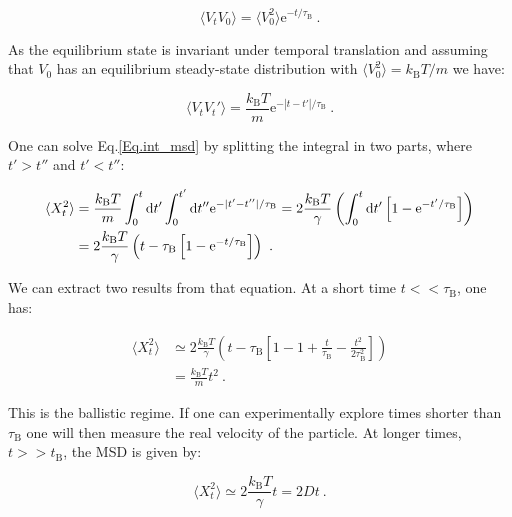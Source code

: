\begin{equation}
	\langle V_t V_0 \rangle = \langle V_0 ^2 \rangle \mathrm{e}^{-t/\tau_{\mathrm{B}}}~.
\end{equation}

As the equilibrium state is invariant under temporal translation and assuming that $V_0$ has an equilibrium steady-state distribution with $\langle V_0^2 \rangle = k_\mathrm{B} T / m$ we have:

\begin{equation}
	\langle V_t V_t' \rangle = \frac{k_\mathrm{B}T}{m} \mathrm{e}^{-|t-t'|/\tau_{\mathrm{B}}}~.
\end{equation}

One can solve Eq.\ref{Eq.int_msd} by splitting the integral in two parts, where $t'>t''$ and $ t' < t''$:

\begin{equation}
	\begin{aligned}
		\langle X_t ^2 \rangle & =    \frac{k_\mathrm{B}T}{m}  \int _0 ^t \textnormal{d}t' \int _0 ^{t'} \textnormal{d}t'' \mathrm{e} ^ {- |t' - t''| / \tau_\mathrm{B}} = 2 \frac{k_\mathrm{B}T}{\gamma} \left( \int_0 ^t \textnormal{d}t' \left[1 - \mathrm{e}^{-t'/\tau_\mathrm{B}} \right] \right) \\
		& = 2 \frac{k_\mathrm{B} T}{\gamma} \left( t - \tau_\mathrm{B} \left[ 1 - \mathrm{e}^{-t/\tau_\mathrm{B}} \right] \right) ~.
	\end{aligned}
\end{equation}

We can extract two results from that equation. At a short time $t << \tau_\mathrm{B}$, one has:

\begin{equation}
	\begin{aligned}
		\langle X_t ^2 \rangle & \simeq  2 \frac{k_\mathrm{B} T}{\gamma} \left( t - \tau_\mathrm{B} \left[ 1 - 1 + \frac{t}{\tau_\mathrm{B}} - \frac{t^2}{ 2 \tau_\mathrm{B} ^2}\right]         \right) \\
		& = \frac{k_\mathrm{B} T}{m} t^2 ~.
	\end{aligned}
	\label{Eq.shorttimemsd}
\end{equation}

This is the ballistic regime. If one can experimentally explore times shorter than $\tau _ \mathrm{B} $ one will then measure the real velocity of the particle. At longer times, $t >> t_\mathrm{B}$, the \gls{MSD} is given by:

\begin{equation}
	\langle X_t ^2 \rangle \simeq 2 \frac{k_\mathrm{B}T}{\gamma} t = 2Dt ~.
	\label{eq:longtimemsd}
\end{equation}


